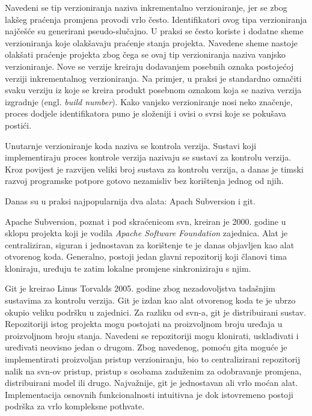 \documentclass[times, utf8, diplomski, numeric]{fer}
\newcommand{\eng}[1]{(engl. \textit{#1})}
\begin{document}
Navedeni se tip verzioniranja naziva inkrementalno verzioniranje, jer se zbog lakšeg praćenja promjena provodi vrlo često. Identifikatori ovog tipa verzioniranja najčešće su generirani pseudo-slučajno. U praksi se često koriste i dodatne sheme verzioniranja koje olakšavaju praćenje stanja projekta. Navedene sheme nastoje olakšati praćenje projekta zbog čega se ovaj tip verzioniranja naziva vanjsko verzioniranje. Nove se verzije kreiraju dodavanjem posebnih oznaka postojećoj verziji inkrementalnog verzioniranja. Na primjer, u praksi je standardno označiti svaku verziju iz koje se kreira produkt posebnom oznakom koja se naziva verzija izgradnje \eng{build number}. Kako vanjsko verzioniranje nosi neko značenje, proces dodjele identifikatora puno je složeniji i ovisi o svrsi koje se pokušava postići.

Unutarnje verzioniranje koda naziva se kontrola verzija\citep{wiki:VersionControl}. Sustavi koji implementiraju proces kontrole verzija nazivaju se sustavi za kontrolu verzija. Kroz povijest je razvijen veliki broj sustava za kontrolu verzija, a danas je timski razvoj programske potpore gotovo nezamisliv bez korištenja jednog od njih.

Danas su u praksi najpopularnija dva alata: Apach Subversion i git.

Apache Subversion, poznat i pod skraćenicom svn, kreiran je 2000. godine u sklopu projekta koji je vodila \textit{Apache Software Foundation} zajednica. Alat je centraliziran, siguran i jednostavan za korištenje te je danas objavljen kao alat otvorenog koda. Generalno, postoji jedan glavni repozitorij koji članovi tima kloniraju, uređuju te zatim lokalne promjene sinkroniziraju s njim.

Git je kreirao Linus Torvalds 2005. godine zbog nezadovoljstva tadašnjim sustavima za kontrolu verzija. Git je izdan kao alat otvorenog koda te je ubrzo okupio veliku podršku u zajednici. Za razliku od svn-a, git je distribuirani sustav. Repozitoriji istog projekta mogu postojati na proizvoljnom broju uređaja u proizvoljnom broju stanja. Navedeni se repozitoriji mogu klonirati, usklađivati i uređivati neovisno jedan o drugom. Zbog navedenog, pomoću gita moguće je implementirati proizvoljan pristup verzioniranju, bio to centralizirani repozitorij nalik na svn-ov pristup, pristup s osobama zaduženim za odobravanje promjena, distribuirani model ili drugo. Najvažnije, git je jednostavan ali vrlo moćan alat. Implementacija osnovnih funkcionalnosti intuitivna je dok istovremeno postoji podrška za vrlo kompleksne pothvate.
\end{document}
